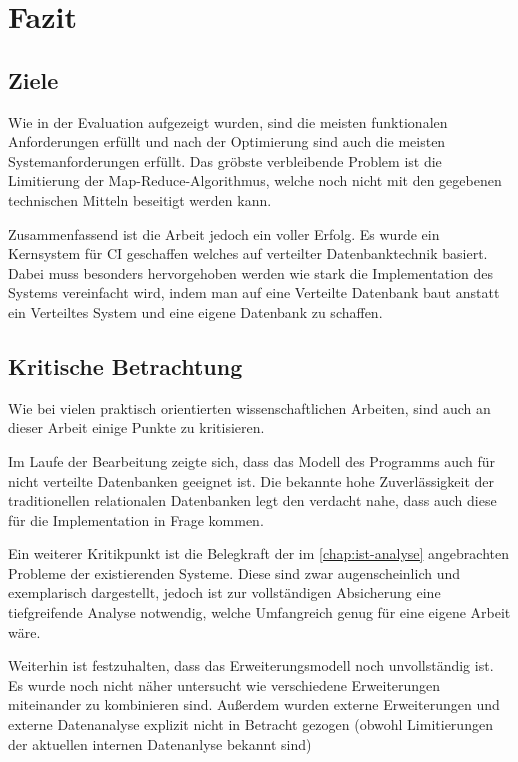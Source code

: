 \chapter{Fazit}
\label{cha:fazit}


\section{Ziele}
\label{sec:fazit:ziele}

Wie in der Evaluation aufgezeigt wurden, sind die meisten funktionalen Anforderungen erfüllt und nach der Optimierung sind auch die meisten Systemanforderungen erfüllt.
Das gröbste verbleibende Problem ist die Limitierung der Map-Reduce-Algorithmus,
welche noch nicht mit den gegebenen technischen Mitteln beseitigt werden kann.

Zusammenfassend ist die Arbeit jedoch ein voller Erfolg.
Es wurde ein Kernsystem für \ac{CI} geschaffen welches auf verteilter Datenbanktechnik basiert.
Dabei muss besonders hervorgehoben werden wie stark die Implementation des Systems vereinfacht wird, indem man auf eine Verteilte Datenbank baut anstatt ein Verteiltes System und eine eigene Datenbank zu schaffen.


\section{Kritische Betrachtung}
\label{sec:fazit:kritik}

Wie bei vielen praktisch orientierten wissenschaftlichen Arbeiten,
sind auch an dieser Arbeit einige Punkte zu kritisieren.

Im Laufe der Bearbeitung zeigte sich, dass das Modell des Programms auch für
nicht verteilte Datenbanken geeignet ist.
Die bekannte hohe Zuverlässigkeit der traditionellen relationalen Datenbanken legt den verdacht nahe, dass auch diese für die Implementation in Frage kommen.

Ein weiterer Kritikpunkt ist die Belegkraft der im \cref{chap:ist-analyse} angebrachten Probleme der existierenden Systeme. Diese sind zwar augenscheinlich und exemplarisch dargestellt, jedoch ist zur vollständigen Absicherung eine tiefgreifende Analyse notwendig, welche Umfangreich genug für eine eigene Arbeit wäre.

Weiterhin ist festzuhalten, dass das Erweiterungsmodell noch unvollständig ist.
Es wurde noch nicht näher untersucht wie verschiedene Erweiterungen miteinander zu kombinieren sind. Außerdem wurden externe Erweiterungen und externe Datenanalyse explizit nicht in Betracht gezogen (obwohl Limitierungen der aktuellen internen Datenanlyse bekannt sind)

